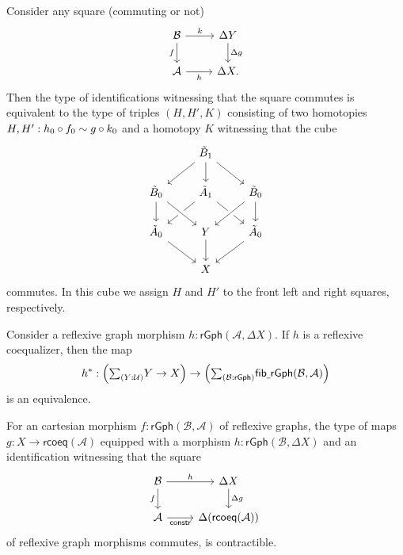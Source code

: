 \begin{lem}
Consider any square (commuting or not)
\begin{equation*}
\begin{tikzcd}
\mathcal{B} \arrow[d,swap,"f"] \arrow[r,"k"] & \Delta Y \arrow[d,"\Delta g"] \\
\mathcal{A} \arrow[r,swap,"h"] & \Delta X.
\end{tikzcd}
\end{equation*}
Then the type of identifications witnessing that the square commutes is equivalent to the type of triples $(H,H',K)$ consisting of two homotopies $H,H': h_0 \circ f_0\sim g\circ k_0$ and a homotopy $K$ witnessing that the cube
\begin{equation*}
\begin{tikzcd}
& \tilde{B}_1 \arrow[dl] \arrow[d] \arrow[dr] \\
\tilde{B}_0 \arrow[d] & \tilde{A}_1 \arrow[dl] \arrow[dr] & \tilde{B}_0 \arrow[dl,crossing over] \arrow[d] \\
\tilde{A}_0 \arrow[dr] & Y \arrow[from=ul,crossing over] \arrow[d] & \tilde{A}_0 \arrow[dl] \\
& X
\end{tikzcd}
\end{equation*}
commutes. In this cube we assign $H$ and $H'$ to the front left and right squares, respectively.
\end{lem}

\begin{thm}\label{thm:descent_rcoeq}
Consider a reflexive graph morphism $h:\mathsf{rGph}(\mathcal{A},\Delta X)$. If $h$ is a reflexive coequalizer, then the map
\begin{equation*}
h^\ast : \Big(\sm{Y:\UU}Y\to X\Big)\to \Big(\sm{\mathcal{B}:\mathsf{rGph}}\mathsf{fib\usc{}rGph}(\mathcal{B},\mathcal{A})\Big)
\end{equation*}
is an equivalence. 
\end{thm}

\begin{cor}\label{cor:descent_rcoeq}
For an cartesian morphism $f:\mathsf{rGph}(\mathcal{B},\mathcal{A})$ of reflexive graphs, the type of maps $g:X\to \mathsf{rcoeq}(\mathcal{A})$ equipped with a morphism $h:\mathsf{rGph}(\mathcal{B},\Delta X)$ and an identification witnessing that the square
\begin{equation*}
\begin{tikzcd}
\mathcal{B} \arrow[d,swap,"f"] \arrow[r,"h"] & \Delta X \arrow[d,"\Delta g"] \\
\mathcal{A} \arrow[r,swap,"\mathsf{constr}"] & \Delta(\mathsf{rcoeq}(\mathcal{A}))
\end{tikzcd}
\end{equation*}
of reflexive graph morphisms commutes, is contractible.
\end{cor}


